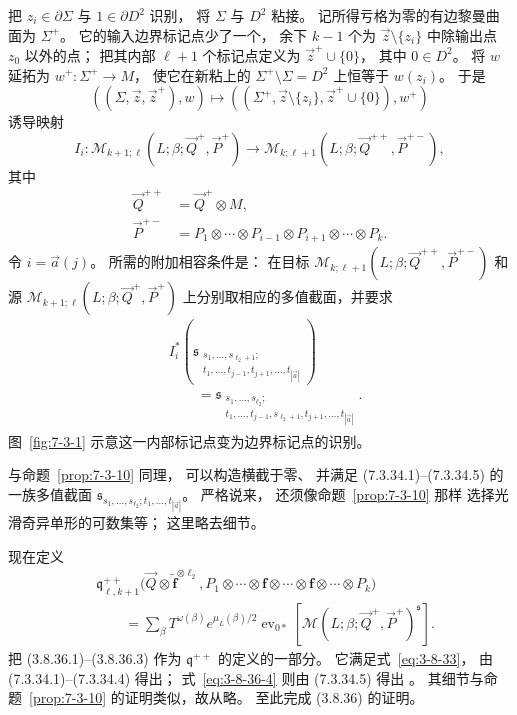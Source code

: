 把 $z_i\in\partial\Sigma$
与 $1\in\partial D^2$ 识别，
将 $\Sigma$ 与 $D^2$ 粘接。
记所得亏格为零的有边黎曼曲面为
$\Sigma^+$。
它的输入边界标记点少了一个，
余下 $k-1$ 个为
$\vec z\setminus\{z_i\}$
中除输出点 $z_0$ 以外的点；
把其内部 $\ell+1$ 个标记点定义为
$\vec z^+\cup\{0\}$，
其中 $0\in D^2$。
将 $w$ 延拓为
$w^+\colon\Sigma^+\to M$，
使它在新粘上的
$\Sigma^+\setminus\Sigma=D^2$
上恒等于 $w(z_i)$。
于是
\[
((\Sigma,\vec z,\vec z^+),w)
\longmapsto
((\Sigma^+,\vec z\setminus\{z_i\},
\vec z^+\cup\{0\}),w^+)
\]
诱导映射
\[
I_i\colon
\mathcal M_{k+1;\ell}
(L;\beta;\vec Q^+,\vec P^+)
\longrightarrow
\mathcal M_{k;\ell+1}
(L;\beta;\vec Q^{++},\vec P^{+-}),
\]
其中
\[
\begin{aligned}
\vec Q^{++}&=\vec Q^+\otimes M,\\
\vec P^{+-}
&=P_1\otimes\cdots\otimes P_{i-1}
\otimes P_{i+1}\otimes\cdots\otimes P_k.
\end{aligned}
\]
令 $i=\vec a(j)$。
所需的附加相容条件是：
在目标
$\mathcal M_{k;\ell+1}
(L;\beta;\vec Q^{++},\vec P^{+-})$
和源
$\mathcal M_{k+1;\ell}
(L;\beta;\vec Q^+,\vec P^+)$
上分别取相应的多值截面，并要求
\begin{equation}
\begin{aligned}
&I_i^*\!\left(
\mathfrak s_{
\substack{s_1,\ldots,s_{\ell_2+1};\\
t_1,\ldots,t_{j-1},t_{j+1},\ldots,t_{|\vec a|}}}
\right)\\
&\qquad=
\mathfrak s_{
\substack{s_1,\ldots,s_{\ell_2};\\
t_1,\ldots,t_{j-1},s_{\ell_2+1},
t_{j+1},\ldots,t_{|\vec a|}}}.
\end{aligned}
\tag{7.3.34.5}\label{cond:7-3-34-5}
\end{equation}
图~\ref{fig:7-3-1}
示意这一内部标记点变为边界标记点的识别。


与命题~\ref{prop:7-3-10} 同理，
可以构造横截于零、
并满足 (7.3.34.1)--(7.3.34.5)
的一族多值截面
$\mathfrak s_{s_1,\ldots,s_{\ell_2};
t_1,\ldots,t_{|\vec a|}}$。
严格说来，
还须像命题~\ref{prop:7-3-10} 那样
选择光滑奇异单形的可数集等；
这里略去细节。

现在定义
\[
\begin{aligned}
&\mathfrak q^{++}_{\ell,k+1}
\bigl(
\vec Q\otimes
\widetilde{\mathbf f}^{\otimes\ell_2},
P_1\otimes\cdots\otimes\mathbf f
\otimes\cdots\otimes\mathbf f
\otimes\cdots\otimes P_k
\bigr)\\
&\qquad=
\sum_\beta T^{\omega(\beta)}
e^{\mu_L(\beta)/2}
\operatorname{ev}_{0*}
\left[
\mathcal M
(L;\beta;\vec Q^+,\vec P^+)^{\mathfrak s}
\right].
\end{aligned}
\]
把 (3.8.36.1)--(3.8.36.3)
作为 $\mathfrak q^{++}$ 的定义的一部分。
它满足式~\eqref{eq:3-8-33}，
由 (7.3.34.1)--(7.3.34.4) 得出；
式~\eqref{eq:3-8-36-4}
则由 (7.3.34.5) 得出
。
其细节与命题~\ref{prop:7-3-10}
的证明类似，故从略。
至此完成 (3.8.36) 的证明。
